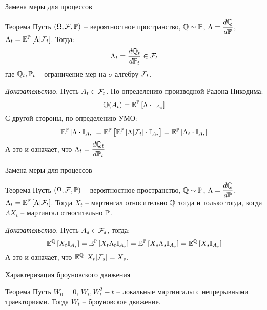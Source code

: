 \documentclass[aspectratio=169]{beamer}
\begin{document}
\begin{frame}{Замена меры для процессов}
    \begin{block}{Теорема}
        Пусть $(\Omega, \mathcal{F}, \mathbb{P})$ -- вероятностное пространство, $\mathbb{Q} \sim \mathbb{P}$, $\Lambda = \dfrac{d\mathbb{Q}}{d\mathbb{P}}$, $\Lambda_t = \mathbb{E}^{\mathbb{P}}\left[ \Lambda | \mathcal{F}_t \right]$. Тогда:
        $$
            \Lambda_t = \dfrac{d\mathbb{Q}_t}{d\mathbb{P}_t} \in \mathcal{F}_t
        $$где $\mathbb{Q}_t, \mathbb{P}_t$ -- ограничение мер на $\sigma$-алгебру $\mathcal{F}_t$. 
    \end{block}
    \textit{Доказательство}. Пусть $A_t \in \mathcal{F}_t$. По определению производной Радона-Никодима:
    $$
        \mathbb{Q}(A_t) = \mathbb{E}^{\mathbb{P}} \left[\Lambda \cdot \mathbb{I}_{A_t}\right]
    $$С другой стороны, по определению УМО:
    $$
        \mathbb{E}^{\mathbb{P}} \left[\Lambda \cdot \mathbb{I}_{A_t}\right] = \mathbb{E}^{\mathbb{P}} \left[\mathbb{E}^{\mathbb{P}}\left[ \Lambda | \mathcal{F}_t \right] \cdot \mathbb{I}_{A_t}\right]
        = \mathbb{E}^{\mathbb{P}} \left[\Lambda_t \cdot \mathbb{I}_{A_t}\right]
    $$А это и означает, что $\Lambda_t = \dfrac{d\mathbb{Q}_t}{d\mathbb{P}_t}$
\end{frame}

\begin{frame}{Замена меры для процессов}
    \begin{block}{Теорема}
        Пусть $(\Omega, \mathcal{F}, \mathbb{P})$ -- вероятностное пространство, 
        $\mathbb{Q} \sim \mathbb{P}$, $\Lambda = \dfrac{d\mathbb{Q}}{d\mathbb{P}}$, $\Lambda_t = \mathbb{E}^{\mathbb{P}}\left[ \Lambda | \mathcal{F}_t \right]$. 
        Тогда $X_t$ -- мартингал относительно $\mathbb{Q}$ тогда и только тогда, когда $\Lambda X_t$ -- мартингал относительно $\mathbb{P}$. 
    \end{block}
    \textit{Доказательство}. Пусть $A_s \in \mathcal{F}_s$, тогда:
    $$
        \mathbb{E}^{\mathbb{Q}} \left[ X_t \mathbb{I}_{A_s}\right]
        = \mathbb{E}^{\mathbb{P}} \left[ X_t \Lambda_t \mathbb{I}_{A_s}\right]
        = \mathbb{E}^{\mathbb{P}} \left[ X_s \Lambda_s \mathbb{I}_{A_s}\right]
        = \mathbb{E}^{\mathbb{Q}} \left[ X_s\mathbb{I}_{A_s}\right]
    $$А это и означает, что $\mathbb{E}^{\mathbb{Q}} \left[ X_t | \mathcal{F}_s\right] = X_s$.
\end{frame}

\begin{frame}{Характеризация броуновского движения}
    \begin{block}{Теорема}
        Пусть $W_0 = 0$, $W_t, W_t^2 - t$ -- локальные мартингалы с непрерывными траекториями. Тогда $W_t$ -- броуновское движение.
    \end{block}
\end{frame}
\end{document}
